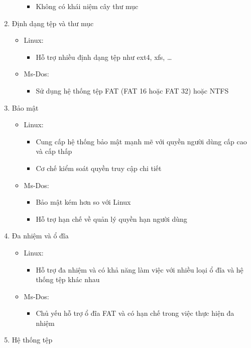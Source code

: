 \documentclass[12pt,a4paper]{article}
\begin{document}
\begin{enumerate}
\begin{itemize}
\begin{itemize}
				\item Không có khái niệm cây thư mục
			\end{itemize} 
		\end{itemize}
	\item Định dạng tệp và thư mục
		\begin{itemize}
		\item Linux:
		\begin{itemize}
			\item Hỗ trợ nhiều định dạng tệp như ext4, xfs, …	
		\end{itemize}
		\item Ms-Dos:
		\begin{itemize}
			\item Sử dụng hệ thống tệp FAT (FAT 16 hoặc FAT 32) hoặc NTFS
		\end{itemize} 
	\end{itemize}
	\item Bảo mật
		\begin{itemize}
		\item Linux:
		\begin{itemize}
			\item Cung cấp hệ thống bảo mật mạnh mẽ với quyền người dùng cấp cao và cấp thấp
			\item Cơ chế kiểm soát quyền truy cập chi tiết
		\end{itemize}
		\item Ms-Dos:
		\begin{itemize}
			\item Bảo mật kém hơn so với Linux
			\item Hỗ trợ hạn chế về quản lý quyền hạn người dùng
		\end{itemize} 
	\end{itemize}
	\item Đa nhiệm và ổ đĩa
	\begin{itemize}
		\item Linux:
		\begin{itemize}
			\item Hỗ trợ đa nhiệm và có khả năng làm việc với nhiều loại ổ đĩa và hệ thống tệp khác nhau
		\end{itemize}
		\item Ms-Dos:
		\begin{itemize}
			\item Chủ yếu hỗ trợ ổ đĩa FAT và có hạn chế trong việc thực hiện đa nhiệm
		\end{itemize} 
	\end{itemize}
	\item Hệ thống tệp

\end{enumerate}
\end{document}
